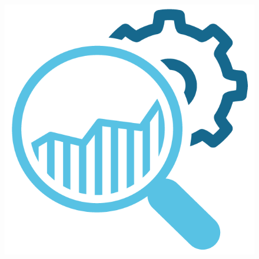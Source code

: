 \documentclass[9pt]{beamer}
\begin{document}
\begin{frame}
\begin{columns}
            \begin{figure}
                \includegraphics[width=\textwidth]{assets/Relleno/Investigacion.png}
            \end{figure}
        \end{columns}

    \end{frame}

        

\end{document}
